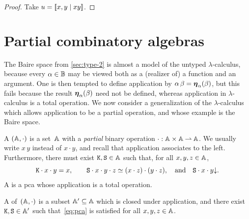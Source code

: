 \begin{proof}
  Take $u = \sem{x, y \ctx x y}$.
\end{proof}




\section{Partial combinatory algebras}
\label{sec:pcas}

The Baire space from \cref{sec:type-2} is almost a model of the
untyped $\lambda$-calculus, because every $\alpha \in \Baire$ may be
viewed both as a (realizer of) a function and an argument. One is then
tempted to define application by $\alpha \, \beta =
\fpr{\alpha}{\beta}$, but this fails because the result $\fpr{\alpha}{\beta}$ need not
be defined, whereas application in $\lambda$-calculus is a total
operation. We now consider a generalization of the $\lambda$-calculus
which allows application to be a partial operation, and whose example
is the Baire space.

\begin{definition}
  \label{def:pca}%
  A  $(\AA, {\cdot})$ is a
  set~$\AA$ with a
  \emph{partial} binary operation ${\cdot} : \AA \times \AA \parto \AA$. We
  usually write $x\, y$ instead of $x \cdot y$, and recall that
  application associates to the left. Furthermore, there must exist
  $\combK, \combS \in \AA$ such that, for all $x, y, z \in \AA$,
  \begin{equation}
    \label{eq:pca}%
    \combK \cdot x \cdot y = x,
    \qquad
    \combS \cdot x \cdot y \cdot z \simeq (x \cdot z) \cdot (y \cdot z),
    \quad\text{and}\quad
    \defined{\combS \cdot x \cdot y}.
  \end{equation}
  A  is a pca whose application
  is a total operation.

  A  of~$(\AA, {\cdot})$ is a subset $\subAA \subseteq \AA$
  which is closed under application, and there exist $\combK, \combS
  \in \subAA$ such that~\eqref{eq:pca} is satisfied for all $x, y, z \in
  \AA$.
\end{definition}

